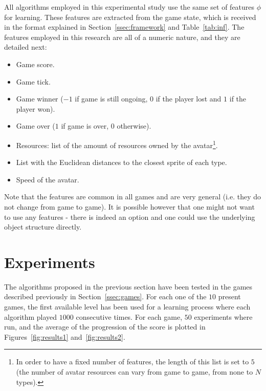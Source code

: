 \documentclass[conference]{IEEEtran}
\newenvironment{mitems}
{\begin{itemize}
\setlength{\itemsep}{1pt}
\setlength{\parskip}{0pt}
\setlength{\parsep}{0pt}}{\end{itemize}}
\begin{document}
All algorithms employed in this experimental study use the same set of features $\phi$ for learning. These features are extracted from the game state, which is received in the format explained in Section~\ref{ssec:framework} and Table~\ref{tab:inf}. The features employed in this research are all of a numeric nature, and they are detailed next:

\begin{mitems}
\item Game score.
\item Game tick.
\item Game winner ($-1$ if game is still ongoing, $0$ if the player lost and $1$ if the player won).
\item Game over ($1$ if game is over, $0$ otherwise).
\item Resources: list of the amount of resources owned by the avatar\footnote{In order to have a fixed number of features, the length of this list is set to $5$ (the number of avatar resources can vary from game to game, from none to $N$ types).}.
\item List with the Euclidean distances to the closest sprite of each type. 
\item Speed of the avatar.
\end{mitems}

Note that the features are common in all games and are very general (i.e. they do not change from game to game). It is possible however that one might not want to use any features - there is indeed an option and one could use the underlying object structure directly. 



\section{Experiments} \label{sec:exp}

The algorithms proposed in the previous section have been tested in the games described previously in Section~\ref{ssec:games}. For each one of the $10$ present games, the first available level has been used for a learning process where each algorithm played $1000$ consecutive times. For each game, $50$ experiments where run, and the average of the progression of the score is plotted in Figures~\ref{fig:results1} and~\ref{fig:results2}. 

\newcommand*{\lefig}{0.43}%
\end{document}
